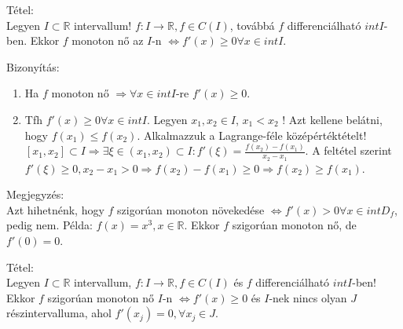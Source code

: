 \documentclass[12pt,a4paper]{scrartcl}
\providecommand{\tightlist}{%
  \setlength{\itemsep}{0pt}\setlength{\parskip}{0pt}}
\newenvironment{tetel}{}{}
\newenvironment{bizonyitas}{}{}
\newenvironment{megjegyzes}{}{}
\begin{document}
\begin{tetel}

Tétel:\\
Legyen \(I \subset {\mathbb{R}}\) intervallum!
\(\left. f:I\rightarrow{\mathbb{R}},f \in C\left( I \right) \right.\),
továbbá \(f\) differenciálható \({int}I\)-ben. Ekkor \(f\) monoton nő az
\(I\)-n
\(\left. \Leftrightarrow f'\left( x \right) \geq 0\forall x \in {int}I \right.\).

\end{tetel}

\begin{bizonyitas}

Bizonyítás:

\begin{enumerate}
\def\labelenumi{\arabic{enumi}.}
\tightlist
\item
  Ha \(f\) monoton nő
  \(\left. \Rightarrow\forall x \in {int}I \right.\)-re
  \(f'\left( x \right) \geq 0\).
\item
  Tfh \(f'\left( x \right) \geq 0\forall x \in {int}I\). Legyen
  \(x_{1},x_{2} \in I\), \(x_{1} < x_{2}\) ! Azt kellene belátni, hogy
  \(f\left( x_{1} \right) \leq f\left( x_{2} \right)\). Alkalmazzuk a
  Lagrange-féle középértéktételt!
  \(\left. \left\lbrack {x_{1},x_{2}} \right\rbrack \subset I\Rightarrow\exists\xi \in \left( {x_{1},x_{2}} \right) \subset I:f'\left( \xi \right) = \frac{f\left( x_{2} \right) - f\left( x_{1} \right)}{x_{2} - x_{1}} \right.\).
  A feltétel szerint
  \(\left. f'\left( \xi \right) \geq 0,x_{2} - x_{1} > 0\Rightarrow f\left( x_{2} \right) - f\left( x_{1} \right) \geq 0\Rightarrow f\left( x_{2} \right) \geq f\left( x_{1} \right) \right.\).
\end{enumerate}

\end{bizonyitas}

\begin{megjegyzes}

Megjegyzés:\\
Azt hihetnénk, hogy \(f\) szigorúan monoton növekedése
\(\left. \Leftrightarrow f'\left( x \right) > 0\forall x \in {int}D_{f} \right.\),
pedig nem. Példa: \(f\left( x \right) = x^{3},x \in {\mathbb{R}}\).
Ekkor \(f\) szigorúan monoton nő, de \(f'\left( 0 \right) = 0\).

\end{megjegyzes}

\begin{tetel}

Tétel:\\
Legyen \(I \subset {\mathbb{R}}\) intervallum,
\(\left. f:I\rightarrow{\mathbb{R}},f \in C\left( I \right) \right.\) és
\(f\) differenciálható \({int}I\)-ben! Ekkor \(f\) szigorúan monoton nő
\(I\)-n \(\left. \Leftrightarrow f'\left( x \right) \geq 0 \right.\) és
\(I\)-nek nincs olyan \(J\) részintervalluma, ahol
\(f'\left( x_{j} \right) = 0,\forall x_{j} \in J\).

\end{tetel}
\end{document}

